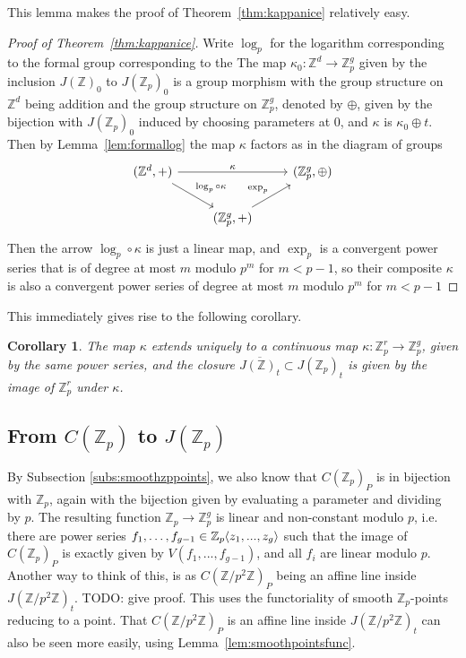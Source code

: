 \documentclass[12pt]{article}
\newcommand{\Z}{\mathbb{Z}}
\renewcommand{\angle}[1]{\hspace{-2pt}\left\langle #1 \right\rangle}
\theoremstyle{plain}
\newtheorem{cor}[thm]{Corollary} %
\theoremstyle{definition}
\theoremstyle{remark}
\begin{document}
This lemma makes the proof of Theorem~\ref{thm:kappanice} relatively easy. 
\begin{proof}[Proof of Theorem~\ref{thm:kappanice}]
Write $\log_p$ for the logarithm corresponding to the formal group corresponding to the The map $\kappa_0: \Z^d \to \Z_p^g$ given by the inclusion $J(\Z)_0$ to $J(\Z_p)_0$ is a group morphism with the group structure on $\Z^d$ being addition and the group structure on $\Z_p^g$, denoted by $\oplus$, given by the bijection with $J(\Z_p)_0$ induced by choosing parameters at $0$, and $\kappa$ is $\kappa_0 \oplus t$. Then by Lemma~\ref{lem:formallog} the map $\kappa$ factors as in the diagram of groups
\[
\begin{tikzcd}
{(\Z^d,+)} \arrow[rr, "\kappa"] \arrow[rd, "\log_p \circ \kappa"] &                                   & {(\Z_p^g,\oplus)} \\
                                                                  & {(\Z_p^g,+)} \arrow[ru, "\exp_p"] &                  
\end{tikzcd}
\]
Then the arrow $\log_p \circ \kappa$ is just a linear map, and $\exp_p$ is a convergent power series that is of degree at most $m$ modulo $p^m$ for $m < p-1$, so their composite $\kappa$ is also a convergent power series of degree at most $m$ modulo $p^m$ for $m < p-1$
\end{proof}

This immediately gives rise to the following corollary.
\begin{cor}
\label{cor:closurejac}
The map $\kappa$ extends uniquely to a continuous map $\kappa: \Z_p^r \to \Z_p^g$, given by the same power series, and the closure $\overline{J(\Z)_t} \subset J(\Z_p)_t$ is given by the image of $\Z_p^r$ under $\kappa$.
\end{cor}

\subsection{From \texorpdfstring{$C(\Z_p)$}{C(Z\_p)} to \texorpdfstring{$J(\Z_p)$}{J(Z\_p)}}
\label{subsection:czptojzp}
By Subsection \ref{subs:smoothzppoints}, we also know that $C(\Z_p)_P$ is in bijection with $\Z_p$, again with the bijection given by evaluating a parameter and dividing by $p$. The resulting function $\Z_p \to \Z_p^g$ is linear and non-constant modulo $p$, i.e. there are power series $f_1,\dots,f_{g-1} \in \Z_p\angle{z_1,...,z_g}$ such that the image of $C(\Z_p)_P$ is exactly given by $V(f_1,...,f_{g-1})$, and all $f_i$ are linear modulo $p$. Another way to think of this, is as $C(\Z/p^2\Z)_P$ being an affine line inside $J(\Z/p^2\Z)_t$.
TODO: give proof. This uses the functoriality of smooth $\Z_p$-points reducing to a point. That $C(\Z/p^2\Z)_P$ is an affine line inside $J(\Z/p^2\Z)_t$ can also be seen more easily, using Lemma~\ref{lem:smoothpointsfunc}. 
\end{document}
